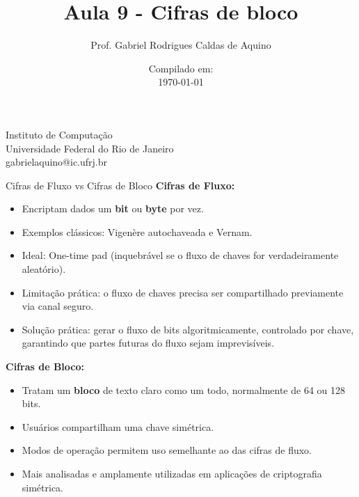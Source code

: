 \title{Aula 9 - Cifras de bloco}

\author{Prof. Gabriel Rodrigues Caldas de Aquino}

\institute
{
    Instituto de Computação \\
    Universidade Federal do Rio de Janeiro\\
    gabrielaquino@ic.ufrj.br%
}
\date{Compilado em: \\ \today} %




\begin{frame}
    \titlepage
\end{frame}

\begin{frame}{Cifras de Fluxo vs Cifras de Bloco}
    \textbf{Cifras de Fluxo:}
    \begin{itemize}
        \item Encriptam dados um \textbf{bit} ou \textbf{byte} por vez.
        \item Exemplos clássicos: Vigenère autochaveada e Vernam.
        \item Ideal: One-time pad (inquebrável se o fluxo de chaves for verdadeiramente aleatório).
        \item Limitação prática: o fluxo de chaves precisa ser compartilhado previamente via canal seguro.
        \item Solução prática: gerar o fluxo de bits algoritmicamente, controlado por chave, garantindo que partes futuras do fluxo sejam imprevisíveis.
    \end{itemize}

    \medskip
    \textbf{Cifras de Bloco:}
    \begin{itemize}
        \item Tratam um \textbf{bloco} de texto claro como um todo, normalmente de 64 ou 128 bits.
        \item Usuários compartilham uma chave simétrica.
        \item Modos de operação permitem uso semelhante ao das cifras de fluxo.
        \item Mais analisadas e amplamente utilizadas em aplicações de criptografia simétrica.
    \end{itemize}
\end{frame}

